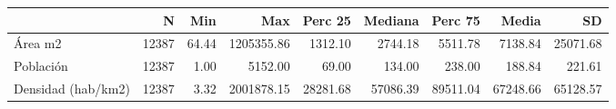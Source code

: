 \begin{table}
\centering
\begin{tabular}[t]{lrrrrrrrr}
\toprule
  & N & Min & Max & Perc 25 & Mediana & Perc 75 & Media & SD\\
\midrule
Área m2 & 12387 & \num{64.44} & \num{1205355.86} & \num{1312.10} & \num{2744.18} & \num{5511.78} & \num{7138.84} & \num{25071.68}\\
Población & 12387 & \num{1.00} & \num{5152.00} & \num{69.00} & \num{134.00} & \num{238.00} & \num{188.84} & \num{221.61}\\
Densidad (hab/km2) & 12387 & \num{3.32} & \num{2001878.15} & \num{28281.68} & \num{57086.39} & \num{89511.04} & \num{67248.66} & \num{65128.57}\\
\bottomrule
\end{tabular}
\end{table}
